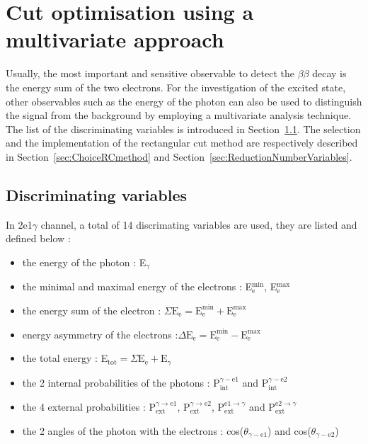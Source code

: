 \documentclass[main.tex]{subfiles}
\begin{document}
\FloatBarrier



\section{Cut optimisation using a multivariate approach}\label{sec:CutOptimisation}


\NI Usually, the most important and sensitive observable to detect the $\beta\beta$ decay is the energy sum of the two electrons. For the investigation of the excited state, other observables such as the energy of the photon can also be used to distinguish the signal from the background by employing a multivariate analysis technique. The list of the discriminating variables is introduced in Section~\ref{sec:discriminatingVariables}. The selection and the implementation of the rectangular cut method are respectively described in Section~\ref{sec:ChoiceRCmethod} and Section~\ref{sec:ReductionNumberVariables}.


\subsection{Discriminating variables}\label{sec:discriminatingVariables}


In 2e1$\gamma$ channel, a total of 14 discrimating variables are used, they are listed and defined below : 


\begin{itemize}
\item the energy of the photon : E$_{\gamma}$
\item the minimal and maximal energy of the electrons : E$_\text{e}^{\text{min}}$, E$_\text{e}^{\text{max}}$
\item the energy sum of the electron : $\Sigma\text{E}_\text{e} = \text{E}_\text{e}^{\text{min}} +  \text{E}_\text{e}^{\text{max}}$
\item energy asymmetry of the electrons :$\Delta\text{E}_\text{e} = \text{E}_\text{e}^{\text{min}} -  \text{E}_\text{e}^{\text{max}}$
\item the total energy : E$_{\text{tot}} = \Sigma\text{E}_{\text{e}} + \text{E}_{\gamma}$
\item the 2 internal probabilities of the photons : P$_{\text{int}}^{\gamma-\text{e1}}$ and  P$_{\text{int}}^{\gamma-\text{e2}}$
\item the 4 external probabilities : P$_{\text{ext}}^{\gamma \rightarrow \text{e1}}$, P$_{\text{ext}}^{\gamma \rightarrow \text{e2}}$, P$_{\text{ext}}^{ \text{e1} \rightarrow\gamma}$ and P$_{\text{ext}}^{ \text{e2} \rightarrow\gamma}$
\item the 2 angles of the photon with the electrons : cos($\theta_{\gamma-\text{e1}}$) and cos($\theta_{\gamma-\text{e2}}$)
\end{itemize}
\end{document}
